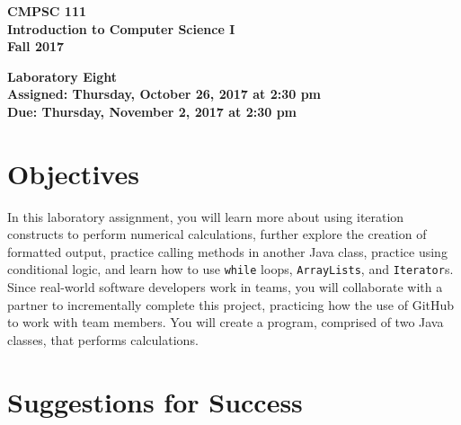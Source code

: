 \documentclass[11pt]{article}
\newcommand{\assignmentduedate}{November 2}
\newcommand{\assignmentassignedate}{October 26}
\newcommand{\assignmentnumber}{Eight}
\newcommand{\labyear}{2017}
\newcommand{\labday}{Thursday}
\newcommand{\labtime}{2:30 pm}
\newcommand{\assigneddate}{Assigned: \labday, \assignmentassignedate, \labyear{} at \labtime{}}
\newcommand{\duedate}{Due: \labday, \assignmentduedate, \labyear{} at \labtime{}}
\newcommand{\labtitle}[1]
{
  \begin{center}
    \begin{center}
      \bf
      CMPSC 111\\Introduction to Computer Science I\\
      Fall 2017\\
      \medskip
    \end{center}
    \bf
    #1
  \end{center}
}
\begin{document}
\thispagestyle{empty}

\labtitle{Laboratory \assignmentnumber{} \\ \assigneddate{} \\ \duedate{}}

\section*{Objectives}

In this laboratory assignment, you will learn more about using iteration constructs to perform numerical calculations,
further explore the creation of formatted output, practice calling methods in another Java class, practice using
conditional logic, and learn how to use {\tt while} loops, {\tt ArrayLists}, and {\tt Iterator}s. Since real-world
software developers work in teams, you will collaborate with a partner to incrementally complete this project,
practicing how the use of GitHub to work with team members. You will create a program, comprised of two Java classes,
that performs calculations.

\section*{Suggestions for Success}
\end{document}
